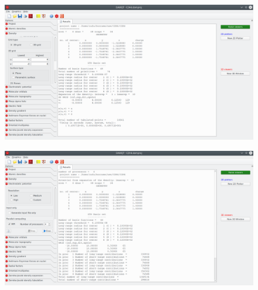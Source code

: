 \documentclass[a4paper,10pt]{article}
\begin{document}
\begin{minipage}{.5\linewidth}
\begin{figure}[H]
\caption{\label{fig:7}}
\begin{center}
\includegraphics[width=0.95\linewidth]{damqt_QS_fig7.png}
\end{center}
\end{figure} 
\end{minipage}
\begin{minipage}{.5\linewidth}
\begin{figure}[H]
\caption{\label{fig:8}}
\begin{center}
\includegraphics[width=0.95\linewidth]{damqt_QS_fig8.png}
\end{center}
\end{figure} 
\end{minipage}
\end{document}
